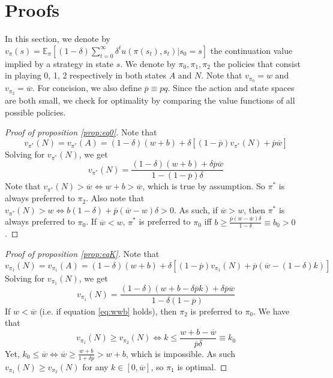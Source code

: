 \documentclass[12pt,a4paper]{article}
\theoremstyle{definition}
\newcommand{\wb}{\overline{w}}
\newcommand{\pb}{\overline{p}}
\newcommand{\de}{\delta}
\begin{document}
{

\newpage
\appendix

\appendixpage

\startcontents[sections]

\section{Proofs}
\label{app:proofs}

In this section, we denote by $v_\pi(s) = \mathbb{E}_\pi \left[ (1-\de) \sum_{t = 0}^\infty \delta^t u(\pi(s_t), s_t) | s_0 = s \right]$ the continuation value implied by a strategy in state $s$. We denote by $\pi_0, \pi_1, \pi_2$  the policies that consist in playing 0, 1, 2 respectively in both states $A$ and $N$. Note that $v_{\pi_0} = w$ and $v_{\pi_2} = \wb$. For concision, we also define $\pb \equiv pq$. Since the action and state spaces are both small, we check for optimality by comparing the value functions of all possible policies. 

\begin{proof}[Proof of proposition \ref{prop:eq0}]
    Note that 
    $$
    v_{\pi^*}(N) = v_{\pi^*}(A) = (1-\de) (w+b) + \de [(1-\pb) v_{\pi^*}(N) + \pb \wb]
    $$
    Solving for $v_{\pi^*}(N)$, we get
    $$
    v_{\pi^*}(N) = \frac{(1-\de)(w+b)+\de \pb \wb}{1 - (1-\pb)\de}
    $$
    Note that $v_{\pi^*}(N) > \wb \iff w + b > \wb$, which is true by assumption. So $\pi^*$ is always preferred to $\pi_2$. Also note that $v_{\pi^*}(N) > w \iff b (1-\de) + \pb (\wb - w) \de > 0$. As such, if $\wb > w$, then $\pi^*$ is always preferred to $\pi_0$. If $\wb < w$,  $\pi^*$  is preferred to $\pi_0$ iff $b \geq \frac{\pb (w - \wb) \de}{1-\de} \equiv b_0 > 0$.
\end{proof}

\begin{proof}[Proof of proposition \ref{prop:eqK}]
    Note that 
    $$
    v_{\pi_1}(N) = v_{\pi_1}(A) = (1-\de) (w+b) + \de [(1-\pb) v_{\pi_1}(N) + \pb (\wb - (1-\de) k)]
    $$
    Solving for $v_{\pi_1}(N)$, we get
    $$
    v_{\pi_1}(N) = \frac{(1-\de)(w+b-\de\pb k)+\de\pb \wb}{1-\de(1-\pb)}
    $$
    If $w < \wb$ (i.e. if equation \ref{eq:wwb} holds), then $\pi_2$ is preferred to $\pi_0$. We have that 
    $$
    v_{\pi_1}(N) \geq v_{\pi_2}(N) \iff k \leq \frac{w+b-\wb}{\pb\de} \equiv k_0
    $$
    Yet, $k_0 \leq \wb \iff \wb \geq \frac{w+b}{1+\de\pb} > w+b$, which is impossible. As such $v_{\pi_1}(N) \geq v_{\pi_2}(N)$ for any $k \in [0,\wb]$, so $\pi_1$ is optimal. 


\end{proof}}
\end{document}
